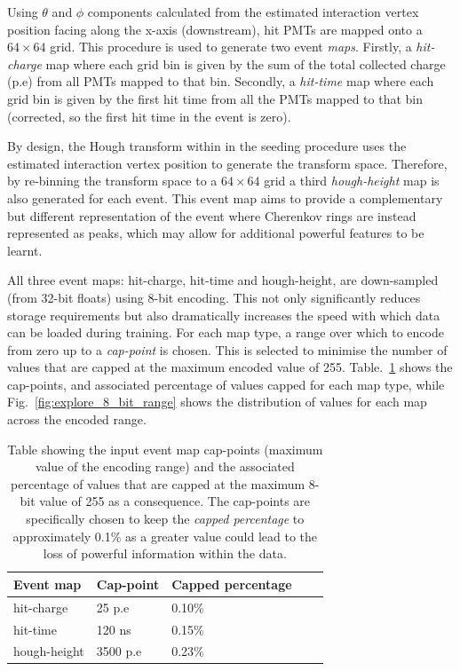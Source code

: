 Using $\theta$ and $\phi$ components calculated from the estimated interaction vertex position
facing along the x-axis (downstream), hit PMTs are mapped onto a $64 \times 64$ grid. This
procedure is used to generate two event \emph{maps}. Firstly, a \emph{hit-charge} map where each
grid bin is given by the sum of the total collected charge (p.e) from all PMTs mapped to that bin.
Secondly, a \emph{hit-time} map where each grid bin is given by the first hit time from all the
PMTs mapped to that bin (corrected, so the first hit time in the event is zero).

By design, the Hough transform within in the seeding procedure uses the estimated interaction
vertex position to generate the transform space. Therefore, by re-binning the transform space to a
$64 \times 64$ grid a third \emph{hough-height} map is also generated for each event. This event
map aims to provide a complementary but different representation of the event where Cherenkov
rings are instead represented as peaks, which may allow for additional powerful features to be
learnt.

All three event maps: hit-charge, hit-time and hough-height, are down-sampled (from 32-bit floats)
using 8-bit encoding. This not only significantly reduces storage requirements but also
dramatically increases the speed with which data can be loaded during training. For each map type,
a range over which to encode from zero up to a \emph{cap-point} is chosen. This is selected to
minimise the number of values that are capped at the maximum encoded value of 255.
Table.~\ref{tab:encoding} shows the cap-points, and associated percentage of values capped for
each map type, while Fig.~\ref{fig:explore_8_bit_range} shows the distribution of values for each
map across the encoded range.

\begin{table}
    \begin{tabular}{lllll}
        Event map    & Cap-point & Capped percentage \\
        \midrule
        hit-charge   & 25 p.e    & 0.10\%            \\
        hit-time     & 120 ns    & 0.15\%            \\
        hough-height & 3500 p.e  & 0.23\%            \\
    \end{tabular}
    \caption[Table of input event map 8-bit cap-points]
    {Table showing the input event map cap-points (maximum value of the encoding range) and the
        associated percentage of values that are capped at the maximum 8-bit value of 255 as a
        consequence. The cap-points are specifically chosen to keep the \emph{capped percentage}
        to approximately 0.1\% as a greater value could lead to the loss of powerful information
        within the data.}
    \label{tab:encoding}
\end{table}

